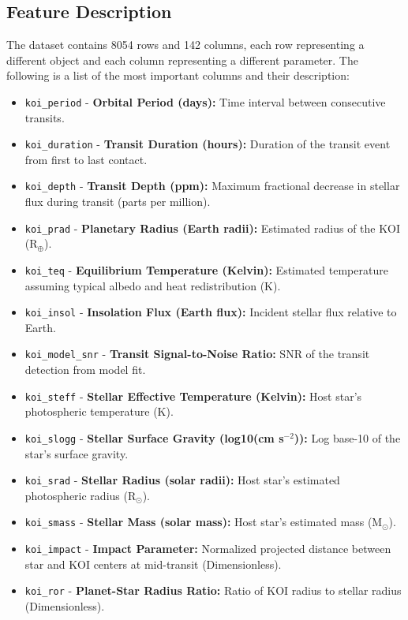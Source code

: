 \subsection{Feature Description}
The dataset contains 8054 rows and 142 columns, each row representing a different object and each column representing a different parameter. The following is a list of the most important columns and their description:
\begin{itemize}
    \item \texttt{koi\_period} - \textbf{Orbital Period (days):} Time interval between consecutive transits.
    \item \texttt{koi\_duration} - \textbf{Transit Duration (hours):} Duration of the transit event from first to last contact.
    \item \texttt{koi\_depth} - \textbf{Transit Depth (ppm):} Maximum fractional decrease in stellar flux during transit (parts per million).
    \item \texttt{koi\_prad} - \textbf{Planetary Radius (Earth radii):} Estimated radius of the KOI (R$_{\oplus}$).
    \item \texttt{koi\_teq} - \textbf{Equilibrium Temperature (Kelvin):} Estimated temperature assuming typical albedo and heat redistribution (K).
    \item \texttt{koi\_insol} - \textbf{Insolation Flux (Earth flux):} Incident stellar flux relative to Earth.
    \item \texttt{koi\_model\_snr} - \textbf{Transit Signal-to-Noise Ratio:} SNR of the transit detection from model fit.
    \item \texttt{koi\_steff} - \textbf{Stellar Effective Temperature (Kelvin):} Host star's photospheric temperature (K).
    \item \texttt{koi\_slogg} - \textbf{Stellar Surface Gravity (log10(cm s$^{-2}$)):} Log base-10 of the star's surface gravity.
    \item \texttt{koi\_srad} - \textbf{Stellar Radius (solar radii):} Host star's estimated photospheric radius (R$_{\odot}$).
    \item \texttt{koi\_smass} - \textbf{Stellar Mass (solar mass):} Host star's estimated mass (M$_{\odot}$).
    \item \texttt{koi\_impact} - \textbf{Impact Parameter:} Normalized projected distance between star and KOI centers at mid-transit (Dimensionless).
    \item \texttt{koi\_ror} - \textbf{Planet-Star Radius Ratio:} Ratio of KOI radius to stellar radius (Dimensionless).

\end{itemize}
